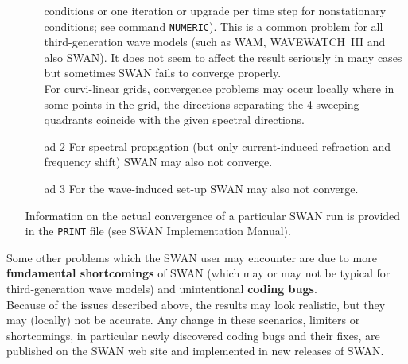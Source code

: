 \documentclass[12pt]{book}
\begin{document}
\begin{itemize}
\begin{itemize}
                       conditions or one iteration or upgrade per time step for nonstationary
                       conditions; see command {\tt NUMERIC}). This is a common problem for all
                       third-generation wave models (such as WAM, WAVEWATCH~III and also SWAN). It
                       does not seem to affect the result seriously in many cases but sometimes
                       SWAN fails to converge properly.
                       \\[2ex]
                       \noindent
                       For curvi-linear grids, convergence problems may occur locally where in some
                       points in the grid, the directions separating the 4 sweeping quadrants coincide
                       with the given spectral directions.
           \item[ad 2] For spectral propagation (but only current-induced refraction and frequency
                       shift) SWAN may also not converge.
           \item[ad 3] For the wave-induced set-up SWAN may also not converge.
         \end{itemize}
         Information on the actual convergence of a particular SWAN run is provided in the
         {\tt PRINT} file (see SWAN Implementation Manual).
\end{itemize}
Some other problems which the SWAN user may encounter are due to more {\bf fundamental shortcomings}
of SWAN (which may or may not be typical for third-generation wave models) and unintentional {\bf coding
bugs}.
\\[2ex]
\noindent
Because of the issues described above, the results may look realistic, but they may (locally) not be
accurate. Any change in these scenarios, limiters or shortcomings, in particular newly discovered coding
bugs and their fixes, are published on the SWAN web site and implemented in new releases of SWAN.
\end{document}
